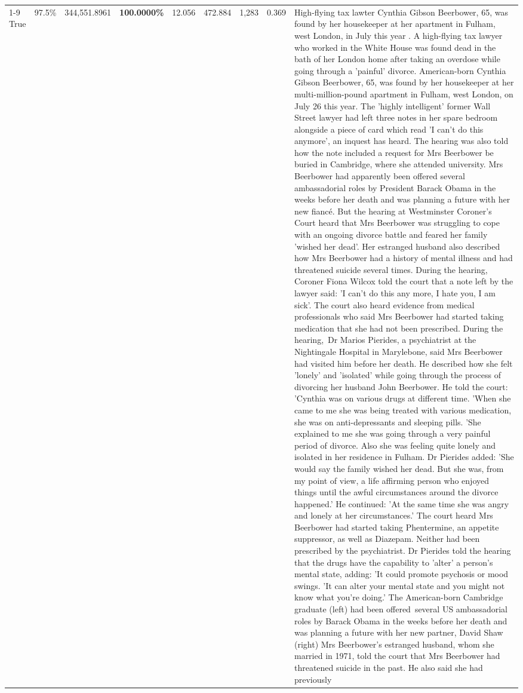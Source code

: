 \begin{table}[H]
\begin{tabular}{lllrlllll}
\cline{1-9}
True & 97.5\% & 344,551.8961 & \bfseries \color{red} 100.0000\% & 12.056 & 472.884 & 1,283 & 0.369 & High-flying tax lawter Cynthia Gibson Beerbower, 65, was found by her housekeeper at her apartment in Fulham, west London, in July this year . A high-flying tax lawyer who worked in the White House was found dead in the bath of her London home after taking an overdose while going through a 'painful' divorce. American-born Cynthia Gibson Beerbower, 65, was found by her housekeeper at her multi-million-pound apartment in Fulham, west London, on July 26 this year. The 'highly intelligent' former Wall Street lawyer had left three notes in her spare bedroom alongside a piece of card which read 'I can't do this anymore', an inquest has heard. The hearing was also told how the note included a request for Mrs Beerbower be buried in Cambridge, where she attended university. Mrs Beerbower had apparently been offered several ambassadorial roles by President Barack Obama in the weeks before her death and was planning a future with her new fiancé. But the hearing at Westminster Coroner's Court heard that Mrs Beerbower was struggling to cope with an ongoing divorce battle and feared her family 'wished her dead'. Her estranged husband also described how Mrs Beerbower had a history of mental illness and had threatened suicide several times. During the hearing, Coroner Fiona Wilcox told the court that a note left by the lawyer said: 'I can't do this any more, I hate you, I am sick'. The court also heard evidence from medical professionals who said Mrs Beerbower had started taking medication that she had not been prescribed. During the hearing, Dr Marios Pierides, a psychiatrist at the Nightingale Hospital in Marylebone, said Mrs Beerbower had visited him before her death. He described how she felt 'lonely' and 'isolated' while going through the process of divorcing her husband John Beerbower. He told the court: 'Cynthia was on various drugs at different time. 'When she came to me she was being treated with various medication, she was on anti-depressants and sleeping pills. 'She explained to me she was going through a very painful period of divorce. Also she was feeling quite lonely and isolated in her residence in Fulham. Dr Pierides added: 'She would say the family wished her dead. But she was, from my point of view, a life affirming person who enjoyed things until the awful circumstances around the divorce happened.' He continued: 'At the same time she was angry and lonely at her circumstances.' The court heard Mrs Beerbower had started taking Phentermine, an appetite suppressor, as well as Diazepam. Neither had been prescribed by the psychiatrist. Dr Pierides told the hearing that the drugs have the capability to 'alter' a person's mental state, adding: 'It could promote psychosis or mood swings. 'It can alter your mental state and you might not know what you're doing.' The American-born Cambridge graduate (left) had been offered several US ambassadorial roles by Barack Obama in the weeks before her death and was planning a future with her new partner, David Shaw (right) Mrs Beerbower's estranged husband, whom she married in 1971, told the court that Mrs Beerbower had threatened suicide in the past. He also said she had previously 
\end{tabular}
\end{table}
